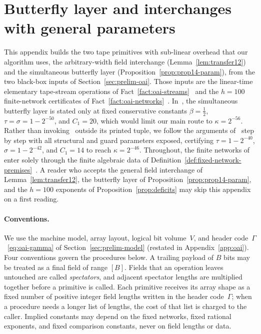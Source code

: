 \section{Butterfly layer and interchanges with general parameters}\label{app:parameter-transfer}\label{app:certificates}

This appendix builds the two tape primitives with sub-linear overhead that our algorithm uses, the arbitrary-width field interchange (Lemma~\ref{lem:transfer12}) and the simultaneous butterfly layer (Proposition~\ref{prop:prop14-param}), from the two black-box inputs of Section~\ref{sec:prelim-oai}. Those inputs are the linear-time elementary tape-stream operations of Fact~\ref{fact:oai-streams}~\cite[Lemmas~3--4]{OAI26} and the $h=100$ finite-network certificates of Fact~\ref{fact:oai-networks}~\cite[Props.~7--8]{OAI26}. In~\cite[Prop.~14]{OAI26}, the simultaneous butterfly layer is stated only at fixed conservative constants $\beta=\frac12$, $\tau=\sigma=1-2^{-50}$, and $C_1=20$, which would limit our main route to $\kappa=2^{-56}$. Rather than invoking~\cite[Prop.~14]{OAI26} outside its printed tuple, we follow the arguments of~\cite[\S\S4--5]{OAI26} step by step with all structural and guard parameters exposed, certifying $\tau=1-2^{-40}$, $\sigma=1-2^{-42}$, and $C_1=14$ to reach $\kappa=2^{-46}$. Throughout, the finite networks of~\cite[\S\S3.1--3.3, Lemmas~5--6]{OAI26} enter solely through the finite algebraic data of Definition~\ref{def:fixed-network-premises}~\cite[Props.~7--8, \S\S3.4--3.5]{OAI26}. A reader who accepts the general field interchange of Lemma~\ref{lem:transfer12}, the butterfly layer of Proposition~\ref{prop:prop14-param}, and the $h=100$ exponents of Proposition~\ref{prop:deficits} may skip this appendix on a first reading.

\paragraph{Conventions.}
We use the machine model, array layout, logical bit volume~$V$, and header code~$\Gamma$~\eqref{eq:oai-gamma} of Section~\ref{sec:prelim-model} (restated in Appendix~\ref{app:oai}). Four conventions govern the procedures below. A trailing payload of $B$ bits may be treated as a final field of range $[B]$. Fields that an operation leaves untouched are called \emph{spectators}, and adjacent spectator lengths are multiplied together before a primitive is called. Each primitive receives its array shape as a fixed number of positive integer field lengths written in the header code~$\Gamma$; when a procedure needs a longer list of lengths, the cost of that list is charged to the caller. Implied constants may depend on the fixed networks, fixed rational exponents, and fixed comparison constants, never on field lengths or data.

